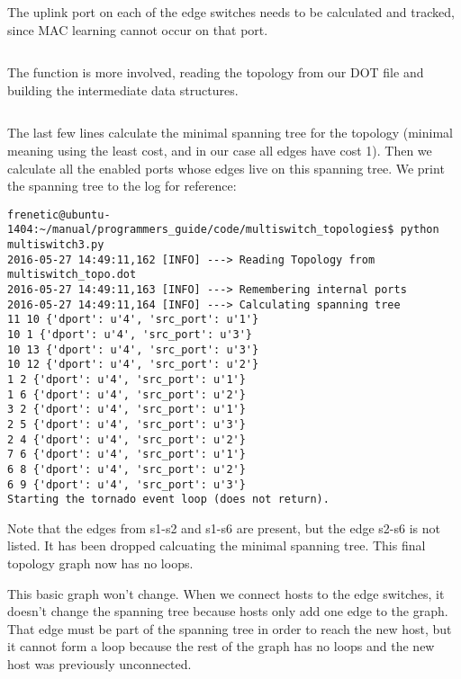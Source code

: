 \inputminted[firstline=29,lastline=33]{python}{code/multiswitch_topologies/network_information_base_from_file.py}

The uplink port on each of the edge switches needs to be calculated and tracked, since MAC learning cannot
occur on that port.

\inputminted[firstline=18,lastline=19]{python}{code/multiswitch_topologies/network_information_base_from_file.py}

The  function is more involved, reading the topology from our DOT file and building the 
intermediate data structures.

\inputminted[firstline=40,lastline=94]{python}{code/multiswitch_topologies/network_information_base_from_file.py}

The last few lines calculate the minimal spanning tree for the topology (minimal meaning using the least cost, and
in our case all edges have cost 1).  Then we calculate all the enabled ports whose edges live on this
spanning tree.  We print the spanning tree to the log for reference:

\begin{verbatim}
frenetic@ubuntu-1404:~/manual/programmers_guide/code/multiswitch_topologies$ python multiswitch3.py
2016-05-27 14:49:11,162 [INFO] ---> Reading Topology from multiswitch_topo.dot
2016-05-27 14:49:11,163 [INFO] ---> Remembering internal ports
2016-05-27 14:49:11,164 [INFO] ---> Calculating spanning tree
11 10 {'dport': u'4', 'src_port': u'1'}
10 1 {'dport': u'4', 'src_port': u'3'}
10 13 {'dport': u'4', 'src_port': u'3'}
10 12 {'dport': u'4', 'src_port': u'2'}
1 2 {'dport': u'4', 'src_port': u'1'}
1 6 {'dport': u'4', 'src_port': u'2'}
3 2 {'dport': u'4', 'src_port': u'1'}
2 5 {'dport': u'4', 'src_port': u'3'}
2 4 {'dport': u'4', 'src_port': u'2'}
7 6 {'dport': u'4', 'src_port': u'1'}
6 8 {'dport': u'4', 'src_port': u'2'}
6 9 {'dport': u'4', 'src_port': u'3'}
Starting the tornado event loop (does not return).
\end{verbatim}

Note that the edges from s1-s2 and s1-s6 are present, but the edge s2-s6 is not listed.  It has been 
dropped calcuating the minimal spanning tree.  This final topology graph now has no loops.

This basic graph won't change.  When we connect hosts to the edge switches, it doesn't change the 
spanning tree because hosts only add one edge to the graph.  That edge must be part of the spanning tree
in order to reach the new host, but it cannot form a loop because the rest of the graph has no loops
and the new host was previously unconnected.  

